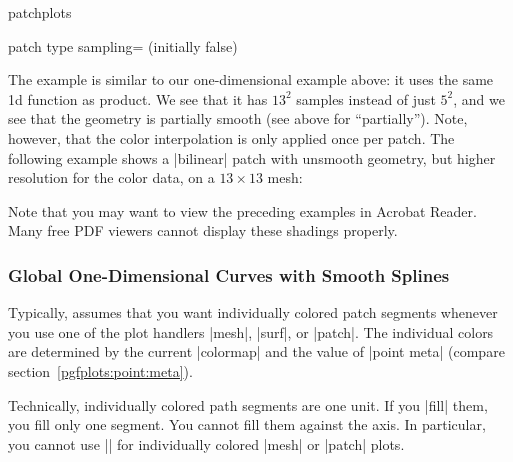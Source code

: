{\begin{pgfplotslibrary}{patchplots}
\begin{pgfplotskey}{patch type sampling= (initially false)}
\begin{codeexample}[]
\end{codeexample}
    The example is similar to our one-dimensional example above: it uses the
    same 1d function as product. We see that it has $13^2$ samples instead of
    just $5^2$, and we see that the geometry is partially smooth (see above for
    ``partially''). Note, however, that the color interpolation is only applied
    once per patch. The following example shows a |bilinear| patch with
    unsmooth geometry, but higher resolution for the color data, on a
    $13\times13$ mesh:
\begin{codeexample}[]
\end{codeexample}
    Note that you may want to view the preceding examples in Acrobat Reader.
    Many free PDF viewers cannot display these shadings properly.
\end{pgfplotskey}


\subsubsection{Global One-Dimensional Curves with Smooth Splines}

Typically, \PGFPlots{} assumes that you want individually colored patch
segments whenever you use one of the plot handlers  |mesh|, |surf|, or |patch|.
The individual colors are determined by the current |colormap| and the value of
|point meta| (compare section~\ref{pgfplots:point:meta}).

Technically, individually colored path segments are one unit. If you |fill|
them, you fill only one segment. You cannot fill them against the axis. In
particular, you cannot use |\closedcycle| for individually colored |mesh| or
|patch| plots.


\end{pgfplotslibrary}}
